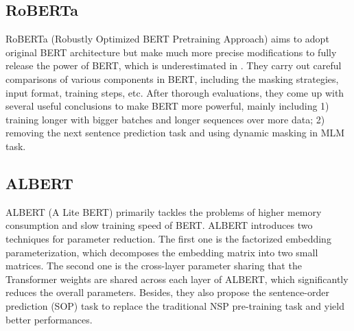 \documentclass[journal]{IEEEtran}
\begin{document}
\begin{CJK*}{UTF8}{gbsn}
\subsection{RoBERTa}
RoBERTa (Robustly Optimized BERT Pretraining Approach) \cite{liu2019roberta} aims to adopt original BERT architecture but make much more precise modifications to fully release the power of BERT, which is underestimated in \cite{devlin-etal-2019-bert}. 
They carry out careful comparisons of various components in BERT, including the masking strategies, input format, training steps, etc. 
After thorough evaluations, they come up with several useful conclusions to make BERT more powerful, mainly including 1) training longer with bigger batches and longer sequences over more data; 2) removing the next sentence prediction task and using dynamic masking in MLM task.


\subsection{ALBERT}
ALBERT (A Lite BERT) \cite{lan2019albert} primarily tackles the problems of higher memory consumption and slow training speed of BERT.
ALBERT introduces two techniques for parameter reduction.
The first one is the factorized embedding parameterization, which decomposes the embedding matrix into two small matrices.
The second one is the cross-layer parameter sharing that the Transformer weights are shared across each layer of ALBERT, which significantly reduces the overall parameters.
Besides, they also propose the sentence-order prediction (SOP) task to replace the traditional NSP pre-training task and yield better performances.


\end{CJK*}
\end{document}
